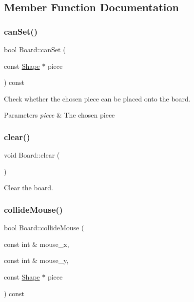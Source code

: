 \subsection{Member Function Documentation}
\mbox{\label{class_board_a7a5e0f3151c694c1212e2b88eb51c57c}} 
\subsubsection{\texorpdfstring{can\+Set()}{canSet()}}
{\footnotesize\ttfamily bool Board\+::can\+Set (\begin{DoxyParamCaption}\item[{const \mbox{\hyperlink{class_shape}{Shape}} $\ast$}]{piece }\end{DoxyParamCaption}) const\hspace{0.3cm}{\ttfamily [inline]}}



Check whether the chosen piece can be placed onto the board. 


\begin{DoxyParams}{Parameters}
{\em piece} & The chosen piece \\
\hline
\end{DoxyParams}
\mbox{\label{class_board_af74f0d4b43e5aa3faea16d7c6407b05e}} 
\subsubsection{\texorpdfstring{clear()}{clear()}}
{\footnotesize\ttfamily void Board\+::clear (\begin{DoxyParamCaption}{ }\end{DoxyParamCaption})\hspace{0.3cm}{\ttfamily [inline]}}



Clear the board. 

\mbox{\label{class_board_aae2c049c36cbe5f07a1e9154a6a6932e}} 
\subsubsection{\texorpdfstring{collide\+Mouse()}{collideMouse()}}
{\footnotesize\ttfamily bool Board\+::collide\+Mouse (\begin{DoxyParamCaption}\item[{const int \&}]{mouse\+\_\+x,  }\item[{const int \&}]{mouse\+\_\+y,  }\item[{const \mbox{\hyperlink{class_shape}{Shape}} $\ast$}]{piece }\end{DoxyParamCaption}) const\hspace{0.3cm}{\ttfamily [inline]}}



